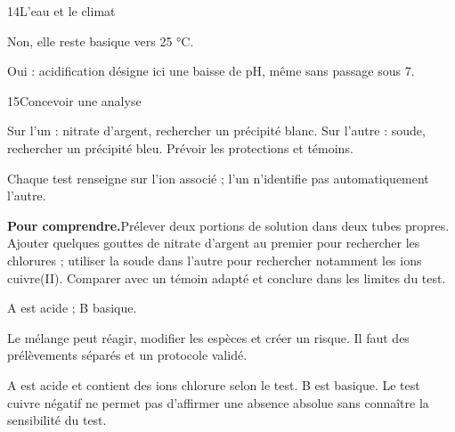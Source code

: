 \par\noindent\begin{minipage}{\linewidth}
\begin{corrige}{14}{L’eau et le climat}
\begin{questions}
\item Non, elle reste basique vers 25 °C.
\item Oui : acidification désigne ici une baisse de pH, même sans passage sous 7.
\end{questions}
\end{corrige}
\end{minipage}
\par\noindent\begin{minipage}{\linewidth}
\begin{corrige}{15}{Concevoir une analyse}
\begin{questions}
\item Sur l’un : nitrate d’argent, rechercher un précipité blanc. Sur l’autre : soude, rechercher un précipité bleu. Prévoir les protections et témoins.
\item Chaque test renseigne sur l’ion associé ; l’un n’identifie pas automatiquement l’autre.
\end{questions}
\par\smallskip\noindent\textbf{Pour comprendre.}\enspace Prélever deux portions de solution dans deux tubes propres. Ajouter quelques gouttes de nitrate d’argent au premier pour rechercher les chlorures ; utiliser la soude dans l’autre pour rechercher notamment les ions cuivre(II). Comparer avec un témoin adapté et conclure dans les limites du test.\par
{}
\end{corrige}
\end{minipage}
\par\noindent\begin{minipage}{\linewidth}
\label{cor-defi-4}\begin{questions}
\item A est acide ; B basique.
\item Le mélange peut réagir, modifier les espèces et créer un risque. Il faut des prélèvements séparés et un protocole validé.
\item A est acide et contient des ions chlorure selon le test. B est basique. Le test cuivre négatif ne permet pas d’affirmer une absence absolue sans connaître la sensibilité du test.
\end{questions}
\end{minipage}

